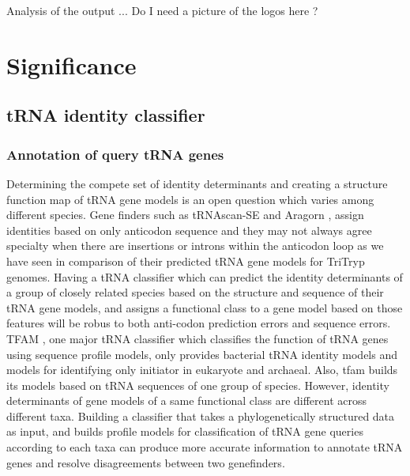 \documentclass[
10pt, %
a4paper, %
oneside, %
headinclude,footinclude, %
BCOR5mm, %
]{scrartcl}
\begin{document}
Analysis of the output ... 
Do I need a picture of the logos here ? 

\section{Significance}

\subsection{\textbf{tRNA identity classifier}}
\subsubsection*{Annotation of query tRNA genes}
Determining the compete set of identity determinants and creating a structure function map of tRNA gene models is an open question which varies among different species. Gene finders such as tRNAscan-SE \cite{trnascan} and Aragorn \cite{aragorn}, assign identities based on only anticodon sequence and they may not always agree specialty when there are insertions or introns within the anticodon loop \cite{PadillaIntron} as we have seen in comparison of their predicted tRNA gene models for TriTryp genomes. Having a tRNA classifier which can predict the identity determinants of a group of closely related species based on the structure and sequence of their tRNA gene models, and assigns a functional class to a gene model based on those features will be robus to both anti-codon prediction errors and sequence errors. TFAM \cite{tfam}, one major tRNA classifier which classifies the function of tRNA genes using sequence profile models, only provides bacterial tRNA identity models and models for identifying only initiator in eukaryote and archaeal. Also, tfam builds its models based on tRNA sequences of one group of species. However, identity determinants of gene models of a same functional class are different across different taxa. Building a classifier that takes a phylogenetically structured data as input, and builds profile models for classification of tRNA gene queries according to each taxa can produce more accurate information to annotate tRNA genes and resolve disagreements between two genefinders.
\end{document}
